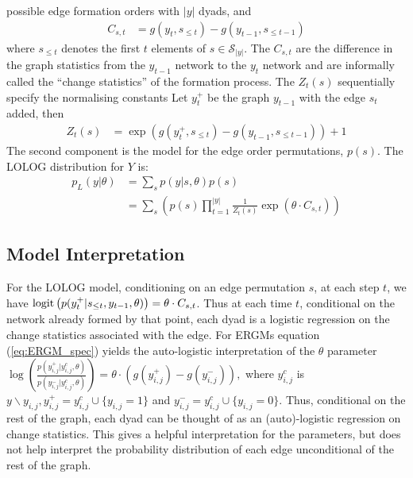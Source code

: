 \documentclass[
]{statsoc}
\begin{document}
possible edge formation orders with \(|y|\) dyads, and \begin{align}
C_{s,t} &= g(y_{t},s_{\leq t}) - g(y_{t-1},s_{\leq t-1})
\end{align} \noindent where \(s_{\leq t}\) denotes the first \(t\)
elements of \(s \in \mathscr{S}_{|y|}\). The \(C_{s,t}\) are the
difference in the graph statistics from the \(y_{t-1}\) network to the
\(y_{t}\) network and are informally called the ``change statistics'' of
the formation process. The \(Z_{t}(s)\) sequentially specify the
normalising constants Let \(y_{t}^{+}\) be the graph \(y_{t-1}\) with
the edge \(s_{t}\) added, then \begin{align}
Z_{t}(s) &= \exp\left(g(y_{t}^{+},s_{\leq t}) - g(y_{t-1},s_{\leq t-1})\right) + 1
\end{align} The second component is the model for the edge order
permutations, \(p(s)\). The LOLOG distribution for \(Y\) is:
\begin{align}
p_{L}(y \vert \theta) &= \sum_{s} p(y \vert s, \theta)p(s) \nonumber \\
&= \sum_{s} \left( p(s)\prod_{t=1}^{|y|} \frac{1}{Z_t(s)} \exp\left(\theta\cdot C_{s,t}\right)\right) \label{eq:lolog}
\end{align}

\subsection{Model Interpretation}

For the LOLOG model, conditioning on an edge permutation \(s\), at each
step \(t\), we have
\({\rm logit}\left( {p(y_{t}^{+} \vert s_{\leq t}, y_{t-1}, \theta )}\right) = \theta\cdot C_{s,t}\).
Thus at each time \(t\), conditional on the network already formed by
that point, each dyad is a logistic regression on the change statistics
associated with the edge. For ERGMs equation (\ref{eq:ERGM_spec}) yields
the auto-logistic interpretation of the \(\theta\) parameter
\(\log\left(\frac{p(y_{i,j}^{+} \vert y_{i,j}^{c}, \theta )}{p(y_{i,j}^{-} \vert y_{i,j}^{c}, \theta )}\right) = \theta\cdot (g(y_{i,j}^{+}) - g(y_{i,j}^{-})),\)
where \(y_{i,j}^{c}\) is
\(y{\backslash}y_{i,j}, y_{i,j}^{+}=y_{i,j}^{c}\cup\{y_{i,j}=1\}\) and
\(y_{i,j}^{-} = y_{i,j}^{c}\cup\{y_{i,j}=0\}\). Thus, conditional on the
rest of the graph, each dyad can be thought of as an (auto)-logistic
regression on change statistics. This gives a helpful interpretation for
the parameters, but does not help interpret the probability distribution
of each edge unconditional of the rest of the graph.
\end{document}
